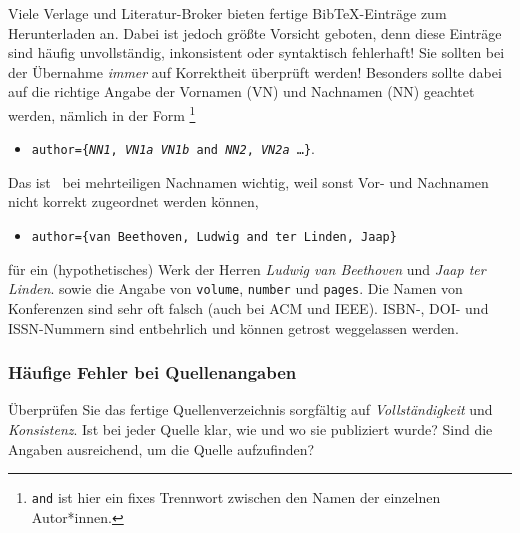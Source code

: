 Viele Verlage und Literatur-Broker bieten fertige BibTeX-Einträge zum Herunterladen an.
Dabei ist jedoch größte Vorsicht geboten, denn diese Einträge sind häufig
unvollständig, inkonsistent oder syntaktisch fehlerhaft!
Sie sollten bei der Übernahme \emph{immer} auf Korrektheit überprüft werden!
Besonders sollte dabei auf die richtige Angabe der Vornamen (VN) und Nachnamen (NN) geachtet werden,
nämlich in der Form%
\footnote{\texttt{and} ist hier ein fixes Trennwort zwischen den Namen der einzelnen Autor*innen.}
\begin{itemize}
\item[]
\texttt{author=\{\textit{NN1}, \textit{VN1a} \emph{VN1b} and \textit{NN2}, \textit{VN2a} \ldots \}}.
\end{itemize}
Das ist \va\ bei mehrteiligen Nachnamen wichtig, weil sonst
Vor- und Nachnamen nicht korrekt zugeordnet werden können, \zB
\begin{itemize}
\item[]
\texttt{author=\{van Beethoven, Ludwig and ter Linden, Jaap\}}
\end{itemize}
für ein (hypothetisches) Werk der Herren \emph{Ludwig van Beethoven} und \emph{Jaap ter Linden}.
sowie die Angabe von \texttt{volume}, \texttt{number} und \texttt{pages}.
Die Namen von Konferenzen sind sehr oft falsch (auch bei ACM und IEEE).
ISBN-, DOI- und ISSN-Nummern sind entbehrlich und können getrost weggelassen werden.


\subsubsection{Häufige Fehler bei Quellenangaben}

Überprüfen Sie das fertige Quellenverzeichnis sorgfältig auf \emph{Vollständigkeit} und \emph{Konsistenz}. 
Ist bei jeder Quelle klar, wie und wo sie publiziert wurde? 
Sind die Angaben ausreichend, um die Quelle aufzufinden?

